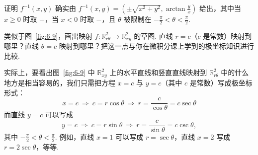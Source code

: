 \begin{question}\label{q:6-6}
证明 $f^{-1}(x,y)$ 确实由 $f^{-1}(x,y)=\left(\pm\sqrt{x^2+y^2},\arctan\frac{y}{x}\right)$ 给出，其中当 $x\geq0$ 时取 $+$，当 $x<0$ 时取 $-$，且 $\theta$ 被限制在 $-\frac{\pi}{2}<\theta<\frac{\pi}{2}$.
\end{question}

\begin{question}\label{q:6-7}
类似于图~\ref{fig:6-9}，画出映射 $f:\mathbb{R}^2_{r\theta}\to\mathbb{R}^2_{xy}$ 的草图. 直线 $r=c$（$c$ 是常数）映射到哪里？直线 $\theta=c$ 映射到哪里？把这一点与你在微积分课上学到的极坐标知识进行比较.
\end{question}

实际上，要看出图~\ref{fig:6-9} 中 $\mathbb{R}^2_{xy}$ 上的水平直线和竖直直线映射到 $\mathbb{R}^2_{r\theta}$ 中的什么地方是相当容易的，我们只需把方程 $x=c$ 与 $y=c$（其中 $c$ 是常数）写成极坐标形式：
\[
x=c\ \Rightarrow\ c=r\cos\theta\ \Rightarrow\ r=\frac{c}{\cos\theta}=c\sec\theta
\]
而直线 $y=c$ 可以写成
\[
y=c\ \Rightarrow\ c=r\sin\theta\ \Rightarrow\ r=\frac{c}{\sin\theta}=c\csc\theta,
\]
其中 $-\frac{\pi}{2}<\theta<\frac{\pi}{2}$. 例如，直线 $x=1$ 可以写成 $r=\sec\theta$，直线 $x=2$ 写成 $r=2\sec\theta$，等等.

